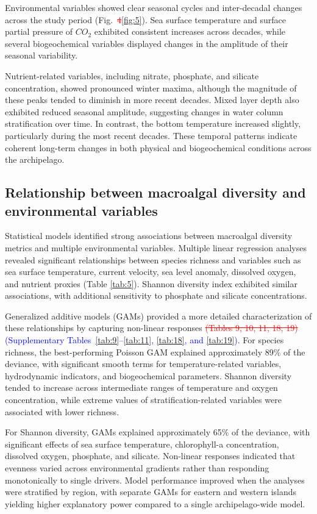 \documentclass[a4paper,fleqn]{cas-sc}
\DeclareRobustCommand{\deleted}[1]{\textcolor{red}{\sout{#1}}}
\DeclareRobustCommand{\added}[1]{\textcolor{blue}{#1}}
\begin{document}
Environmental variables showed clear seasonal cycles and inter-decadal changes across the study period (Fig.~\deleted{4}\added{\ref{fig:5}}). Sea surface temperature and surface partial pressure of $CO_{2}$ exhibited consistent increases across decades, while several biogeochemical variables displayed changes in the amplitude of their seasonal variability. 

Nutrient-related variables, including nitrate, phosphate, and silicate concentration, showed pronounced winter maxima, although the magnitude of these peaks tended to diminish in more recent decades. Mixed layer depth also exhibited reduced seasonal amplitude, suggesting changes in water column stratification over time. In contrast, the bottom temperature increased slightly, particularly during the most recent decades. These temporal patterns indicate coherent long-term changes in both physical and biogeochemical conditions across the archipelago.

\subsection{Relationship between macroalgal diversity and environmental variables}

Statistical models identified strong associations between macroalgal diversity metrics and multiple environmental variables. Multiple linear regression analyses revealed significant relationships between species richness and variables such as sea surface temperature, current velocity, sea level anomaly, dissolved oxygen, and nutrient proxies (Table \ref{tab:5}). Shannon diversity index exhibited similar associations, with additional sensitivity to phosphate and silicate concentrations.

Generalized additive models (GAMs) provided a more detailed characterization of these relationships by capturing non-linear responses \deleted{(Tables 9, 10, 11, 18, 19)}\added{(Supplementary Tables~\ref{tab:9}--\ref{tab:11}, \ref{tab:18}, and \ref{tab:19})}. For species richness, the best-performing Poisson GAM explained approximately 89\% of the deviance, with significant smooth terms for temperature-related variables, hydrodynamic indicators, and biogeochemical parameters. Shannon diversity tended to increase across intermediate ranges of temperature and oxygen concentration, while extreme values of stratification-related variables were associated with lower richness.

For Shannon diversity, GAMs explained approximately 65\% of the deviance, with significant effects of sea surface temperature, chlorophyll-a concentration, dissolved oxygen, phosphate, and silicate. Non-linear responses indicated that evenness varied across environmental gradients rather than responding monotonically to single drivers. Model performance improved when the analyses were stratified by region, with separate GAMs for eastern and western islands yielding higher explanatory power compared to a single archipelago-wide model.
\end{document}
